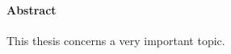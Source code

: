 \documentclass[class=guthesis, crop=false]{standalone}
\begin{document}
\paragraph{Abstract}
This thesis concerns a very important topic.
\end{document}

